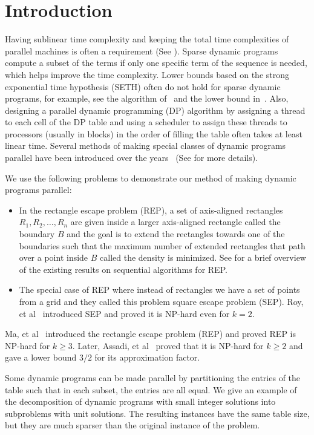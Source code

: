 \documentclass[preprint,12pt]{elsarticle}
\begin{document}
\section{Introduction}\label{sec:introduction}
Having sublinear time complexity and keeping the total time complexities of parallel machines is often a requirement (See ).
Sparse dynamic programs~\cite{eppstein1992sparse,eppstein1992sparse2} compute a subset of the terms if only one specific term of the sequence is needed, which helps improve the time complexity.
Lower bounds based on the strong exponential time hypothesis (SETH) often do not hold for sparse dynamic programs, for example, see the algorithm of~\cite{bringman2018multivariate} and the lower bound in~\cite{bringmann2015quadratic,abboud2015quadratic}.
Also, designing a parallel dynamic programming (DP) algorithm by assigning a thread to each cell of the DP table and using a scheduler to assign these threads to processors (usually in blocks) in the order of filling the table often takes at least linear time. 
Several methods of making special classes of dynamic programs parallel have been introduced over the years~\cite{im2017efficient,aghamolaei2018geometric} (See  for more details).

We use the following problems to demonstrate our method of making dynamic programs parallel:
\begin{itemize}
\item
In the rectangle escape problem (REP), a set of axis-aligned rectangles $R_1,R_2,\ldots,R_n$ are given inside a larger axis-aligned rectangle called the boundary $B$ and the goal is to extend the rectangles towards one of the boundaries such that the maximum number of extended rectangles that path over a point inside $B$ called the density is minimized. See  for a brief overview of the existing results on sequential algorithms for REP.
\item
The special case of REP where instead of rectangles we have a set of points from a grid and they called this problem square escape problem (SEP).
Roy, et al~\cite{fixed} introduced SEP and proved it is NP-hard even for $k=2$.
\end{itemize}
Ma, et al~\cite{ma} introduced the rectangle escape problem (REP) and proved REP is NP-hard for $k\geq 3$. Later, Assadi, et al~\cite{zar1} proved that it is NP-hard for $k\geq 2$ and gave a lower bound $3/2$ for its approximation factor.

Some dynamic programs can be made parallel by partitioning the entries of the table such that in each subset, the entries are all equal.
We give an example of the decomposition of dynamic programs with small integer solutions into subproblems with unit solutions. The resulting instances have the same table size, but they are much sparser than the original instance of the problem.
\end{document}
